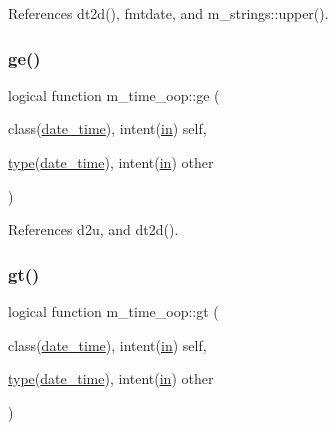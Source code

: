References dt2d(), fmtdate, and m\+\_\+strings\+::upper().

\mbox{\label{namespacem__time__oop_aeea1131ab511b897168f00a908b75458}} 
\subsubsection{\texorpdfstring{ge()}{ge()}}
{\footnotesize\ttfamily logical function m\+\_\+time\+\_\+oop\+::ge (\begin{DoxyParamCaption}\item[{class(\hyperlink{structm__time__oop_1_1date__time}{date\+\_\+time}), intent(\hyperlink{M__journal_83_8txt_afce72651d1eed785a2132bee863b2f38}{in})}]{self,  }\item[{\hyperlink{stop__watch_83_8txt_a70f0ead91c32e25323c03265aa302c1c}{type}(\hyperlink{structm__time__oop_1_1date__time}{date\+\_\+time}), intent(\hyperlink{M__journal_83_8txt_afce72651d1eed785a2132bee863b2f38}{in})}]{other }\end{DoxyParamCaption})\hspace{0.3cm}{\ttfamily [private]}}



References d2u, and dt2d().

\mbox{\label{namespacem__time__oop_a753692f18b6cd100401603d0b88d7c3c}} 
\subsubsection{\texorpdfstring{gt()}{gt()}}
{\footnotesize\ttfamily logical function m\+\_\+time\+\_\+oop\+::gt (\begin{DoxyParamCaption}\item[{class(\hyperlink{structm__time__oop_1_1date__time}{date\+\_\+time}), intent(\hyperlink{M__journal_83_8txt_afce72651d1eed785a2132bee863b2f38}{in})}]{self,  }\item[{\hyperlink{stop__watch_83_8txt_a70f0ead91c32e25323c03265aa302c1c}{type}(\hyperlink{structm__time__oop_1_1date__time}{date\+\_\+time}), intent(\hyperlink{M__journal_83_8txt_afce72651d1eed785a2132bee863b2f38}{in})}]{other }\end{DoxyParamCaption})\hspace{0.3cm}{\ttfamily [private]}}



